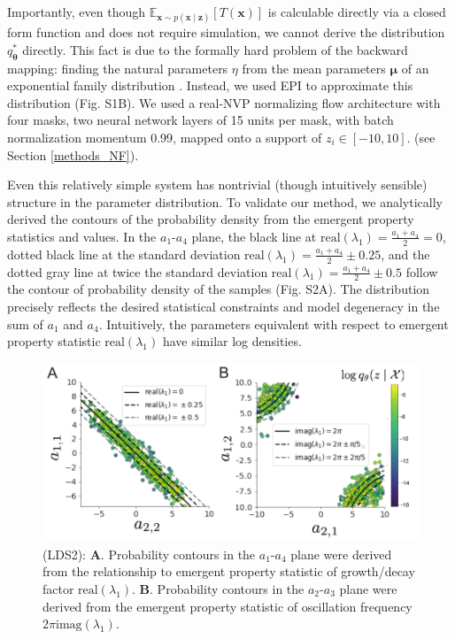 \documentclass[11pt]{article}
\begin{document}
Importantly, even though $\mathbb{E}_{\mathbf{x}\sim p(\mathbf{x} \mid \mathbf{z})}\left[T(\mathbf{x})\right]$ is calculable directly via a closed form function and does not require simulation, we cannot derive the distribution $q^*_{\bm{\theta}}$ directly.  
This fact is due to the formally hard problem of the backward mapping: finding the natural parameters $\eta$ from the mean parameters $\bm{\mu}$ of an exponential family distribution \cite{wainwright2008graphical}.  
Instead, we used EPI to approximate this distribution (Fig. S1B). We used a real-NVP normalizing flow architecture with four masks, two neural network layers of 15 units per mask, with batch normalization momentum 0.99, mapped onto a support of $z_i \in \left[-10, 10 \right]$. (see Section \ref{methods_NF}).

Even this relatively simple system has nontrivial (though intuitively sensible) structure in the parameter distribution.  
To validate our method, we analytically derived the contours of the probability density from the emergent property statistics and values.
In the $a_1$-$a_4$ plane, the black line at $\text{real}(\lambda_1) = \frac{a_1 + a_4}{2} = 0$, dotted black line at
the standard deviation $\text{real}(\lambda_1) = \frac{a_1 + a_4}{2} \pm 0.25$, and the dotted gray line at twice the standard deviation
$\text{real}(\lambda_1) = \frac{a_1 + a_4}{2} \pm 0.5$ follow the contour of probability density of the samples (Fig. S2A). 
The distribution precisely reflects the desired statistical constraints and model degeneracy in the sum of $a_1$ and $a_4$.
Intuitively, the parameters equivalent with respect to emergent property statistic $\text{real}(\lambda_1)$ have similar log densities.

\begin{figure}
\begin{center}
\includegraphics[scale=0.8]{figures/figLDS2/figLDS2.pdf}
\end{center}
\caption{\small (LDS2): \textbf{A}. Probability contours in the $a_1$-$a_4$ plane were derived from the relationship to emergent property statistic of growth/decay factor $\text{real}(\lambda_1)$. 
\textbf{B}. Probability contours in the $a_2$-$a_3$ plane were derived from the emergent property statistic of oscillation frequency $2\pi \text{imag}(\lambda_1)$.}
\label{fig:LDS2}
\end{figure}
\end{document}
